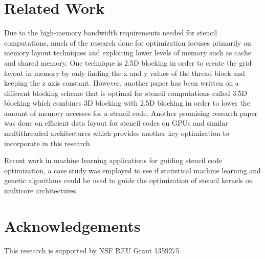\documentclass[conference]{IEEEtran}
\begin{document}
\section{Related Work}
	Due to the high-memory bandwidth requirements needed for stencil computations, much of the research done for optimization focuses primarily on memory layout techniques and exploiting lower levels of memory such as cache and shared memory. One technique is 2.5D blocking in order to create the grid layout in memory by only finding the x and y values of the thread block and keeping the z axis constant\cite{Datta}. However, another paper has been written on a different blocking scheme that is optimal for stencil computations called 3.5D blocking which combines 3D blocking with 2.5D blocking in order to lower the amount of memory accesses for a stencil code\cite{Nguy}. Another promising research paper was done on efficient data layout for stencil codes on GPUs and similar multithreaded architectures which provides another key optimization to incorporate in this research\cite{Jaeger}. 

	Recent work in machine learning applications for guiding stencil code optimization, a case study was employed to see if statistical machine learning and genetic algorithms could be used to guide the optimization of stencil kernels on multicore architectures\cite{Gana}.



\section{Acknowledgements}
	This research is supported by NSF REU Grant 1359275

{ \vspace*{\columnsep} }



\end{document}
